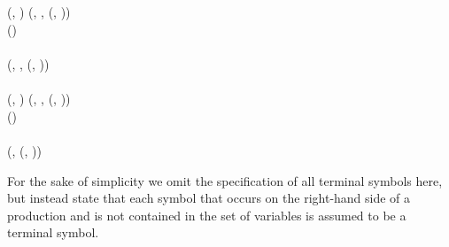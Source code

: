 \begin{algorithm}
\begin{bnf*}
{		} \\
		 \\
		 {
			(, \bnfsp {}) \bnfor {}(, \bnfsp {}, \bnfsp {}(, \bnfsp {}))
		} \\
		 {
			() \bnfsp {} \bnfsp {}
		} \\ \\
		 {
			(\bnfts{$\omega$}, \bnfsp {}, \bnfsp {}(, \bnfsp {})) \bnfor
		} \\
		 \\
		 {
			(, \bnfsp {}) \bnfor {}(, \bnfsp {}, \bnfsp {}(, \bnfsp {}))
		} \\ 
		 {
			() \bnfsp {} \bnfsp {}
		} \\ \\
		 {
			(, \bnfsp {}(, \bnfsp {}))
		} \\
		 {
			 \bnfor \bnfes
		}
	\end{bnf*}
\end{algorithm}
For the sake of simplicity we omit the specification of all terminal symbols here, but instead state that each symbol that occurs on the right-hand side of a production and is not contained in the set of variables is assumed to be a terminal symbol.
